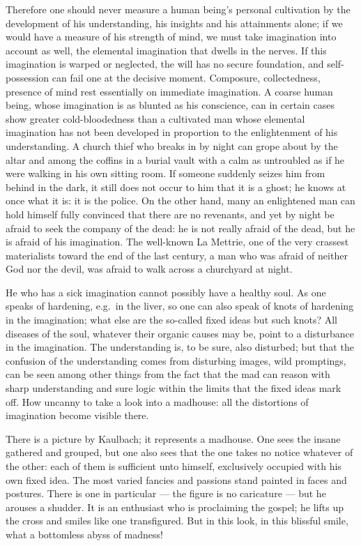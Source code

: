 \documentclass[12pt,a4paper,openany]{book}
\newcommand{\opage}[1]{\marginnote{\footnotesize\textit{[#1]}}}
\begin{document}
Therefore one should never measure a human being's personal cultivation by the development of his understanding, his insights and his attainments alone; if we would have a measure of his strength of mind, we must take imagination into account as well, the elemental imagination that dwells in the nerves. If this imagination is warped or neglected, the will has no secure foundation, and self-possession can fail one at the decisive moment. Composure, collectedness, presence of mind rest essentially on immediate imagination. A coarse human being, whose imagination is as blunted as his conscience, can in certain cases show greater cold-bloodedness than a cultivated man whose elemental imagination has not been developed in proportion to the enlightenment of his understanding. A church thief who breaks in by night can grope about by the altar and among the coffins in a burial vault with a calm as untroubled as if he were walking in his own sitting room. If someone suddenly seizes him from behind in the dark, it still does not occur to him that it is a ghost; he knows at once what it is: it is the police. On the other hand, many an enlightened man can hold himself fully convinced that there are no revenants, and yet by night be afraid to seek the company of the dead: he is not really afraid of the dead, but he is afraid of his imagination.
\setcounter{footnote}{0}%
\opage{79}The well-known La Mettrie, one of the very crassest materialists toward the end of the last century, a man who was afraid of neither God nor the devil, was afraid to walk across a churchyard at night.

He who has a sick imagination cannot possibly have a healthy soul. As one speaks of hardening, e.g.\ in the liver, so one can also speak of knots of hardening in the imagination; what else are the so-called fixed ideas but such knots? All diseases of the soul, whatever their organic causes may be, point to a disturbance in the imagination. The understanding is, to be sure, also disturbed; but that the confusion of the understanding comes from disturbing images, wild promptings, can be seen among other things from the fact that the mad can reason with sharp understanding and sure logic within the limits that the fixed ideas mark off. How uncanny to take a look into a madhouse: all the distortions of imagination become visible there.

There is a picture by Kaulbach; it represents a madhouse. One sees the insane gathered and grouped, but one also sees that the one takes no notice whatever of the other: each of them is sufficient unto himself, exclusively occupied with his own fixed idea. The most varied fancies and passions stand painted in faces and postures. There is one in particular --- the figure is no caricature --- but he arouses a shudder. It is an enthusiast who is proclaiming the gospel; he lifts up the cross and smiles like one transfigured. But in this look, in this blissful smile, what a bottomless abyss of madness!
\end{document}
